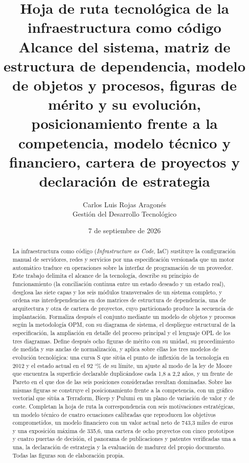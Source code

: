 \documentclass[11pt,letterpaper]{article}
\title{\textbf{Hoja de ruta tecnológica de la infraestructura como código}\\
\large Alcance del sistema, matriz de estructura de dependencia, modelo de
objetos y procesos, figuras de mérito y su evolución, posicionamiento frente a
la competencia, modelo técnico y financiero, cartera de proyectos y
declaración de estrategia}
\author{Carlos Luis Rojas Aragonés\\
Gestión del Desarrollo Tecnológico}
\date{7 de septiembre de 2026}
\newcommand{\pct}{\char`\%}  %
\begin{document}
\maketitle

\begin{abstract}
\noindent\small
La infraestructura como código (\emph{Infrastructure as Code}, IaC) sustituye
la configuración manual de servidores, redes y servicios por una
especificación versionada que un motor automático traduce en operaciones sobre
la interfaz de programación de un proveedor. Este trabajo delimita el alcance
de la tecnología, describe su principio de funcionamiento (la conciliación
continua entre un estado deseado y un estado real), desglosa las siete capas y
los seis módulos transversales de un sistema completo, y ordena sus
interdependencias en dos matrices de estructura de dependencia, una de
arquitectura y otra de cartera de proyectos, cuyo particionado produce la
secuencia de implantación. Formaliza después el conjunto mediante un modelo de
objetos y procesos según la metodología OPM, con su diagrama de sistema, el
despliegue estructural de la especificación, la ampliación en detalle del
proceso principal y el lenguaje OPL de los tres diagramas. Define después ocho
figuras de mérito con su unidad, su procedimiento de medida y sus anclas de
normalización, y aplica sobre ellas los tres modelos de evolución tecnológica:
una curva S que sitúa el punto de inflexión de la tecnología en 2012 y el
estado actual en el 92 \pct{} de su límite, un ajuste al modo de la ley de
Moore que encuentra la superficie declarable duplicándose cada 1,8 a 2,2 años,
y un frente de Pareto en el que dos de las seis posiciones consideradas
resultan dominadas. Sobre las mismas figuras se construye el posicionamiento
frente a la competencia, con un gráfico vectorial que sitúa a Terraform, Bicep
y Pulumi en un plano de variación de valor y de coste. Completan la hoja de
ruta la correspondencia con seis motivaciones estratégicas, un modelo técnico
de cuatro ecuaciones calibradas que reproducen los objetivos comprometidos, un
modelo financiero con un valor actual neto de 743,3 miles de euros y una
exposición máxima de 335,6, una cartera de ocho proyectos con cinco prototipos
y cuatro puertas de decisión, el panorama de publicaciones y patentes
verificadas una a una, la declaración de estrategia y la evaluación de madurez
del propio documento. Todas las figuras son de elaboración propia.
\end{abstract}

\clearpage
\setcounter{tocdepth}{2}
{\setlength{\parskip}{0pt}\tableofcontents}
\clearpage
\end{document}
